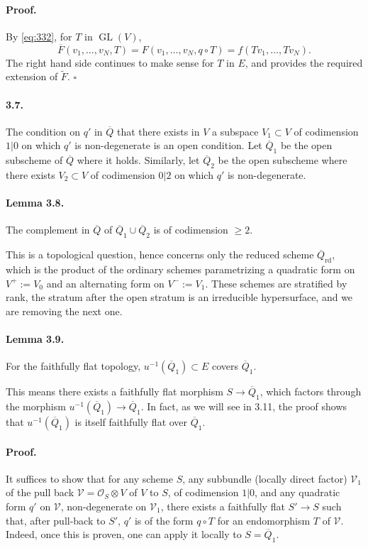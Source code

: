 \documentclass[11pt]{article}
\newcommand{\GL}{\operatorname{GL}}
\newcommand{\rd}{\mathrm{rd}}
\newcommand{\calO}{\mathcal O}
\newcommand{\barQ}{\overline Q}
\begin{document}
\paragraph{Proof.}
By \eqref{eq:332}, for $T$ in $\GL(V)$,
\[
\overline F(v_1,\ldots,v_N,T)=F(v_1,\ldots,v_N,q\circ T)=f(Tv_1,\ldots,Tv_N).
\]
The right hand side continues to make sense for $T$ in $E$, and provides the required extension of $\widetilde F$. \hfill $\square$

\paragraph{3.7.}
The condition on $q'$ in $\barQ$ that there exists in $V$ a subspace $V_1\subset V$ of codimension $1|0$ on which $q'$ is non-degenerate is an open condition. Let $\barQ_1$ be the open subscheme of $\barQ$ where it holds. Similarly, let $\barQ_2$ be the open subscheme where there exists $V_2\subset V$ of codimension $0|2$ on which $q'$ is non-degenerate.

\paragraph{Lemma 3.8.}
The complement in $\barQ$ of $\barQ_1\cup\barQ_2$ is of codimension $\geq2$.

This is a topological question, hence concerns only the reduced scheme $\barQ_{\rd}$, which is the product of the ordinary schemes parametrizing a quadratic form on $V^+:=V_0$ and an alternating form on $V^-:=V_1$. These schemes are stratified by rank, the stratum after the open stratum is an irreducible hypersurface, and we are removing the next one.

\paragraph{Lemma 3.9.}
For the faithfully flat topology, $u^{-1}(\barQ_1)\subset E$ covers $\barQ_1$.

This means there exists a faithfully flat morphism $S\to\barQ_1$, which factors through the morphism $u^{-1}(\barQ_1)\to\barQ_1$. In fact, as we will see in 3.11, the proof shows that $u^{-1}(\barQ_1)$ is itself faithfully flat over $\barQ_1$.

\paragraph{Proof.}
It suffices to show that for any scheme $S$, any subbundle (locally direct factor) $\mathcal V_1$ of the pull back $\mathcal V=\calO_S\otimes V$ of $V$ to $S$, of codimension $1|0$, and any quadratic form $q'$ on $\mathcal V$, non-degenerate on $\mathcal V_1$, there exists a faithfully flat $S'\to S$ such that, after pull-back to $S'$, $q'$ is of the form $q\circ T$ for an endomorphism $T$ of $\mathcal V$. Indeed, once this is proven, one can apply it locally to $S=\barQ_1$.
\end{document}
